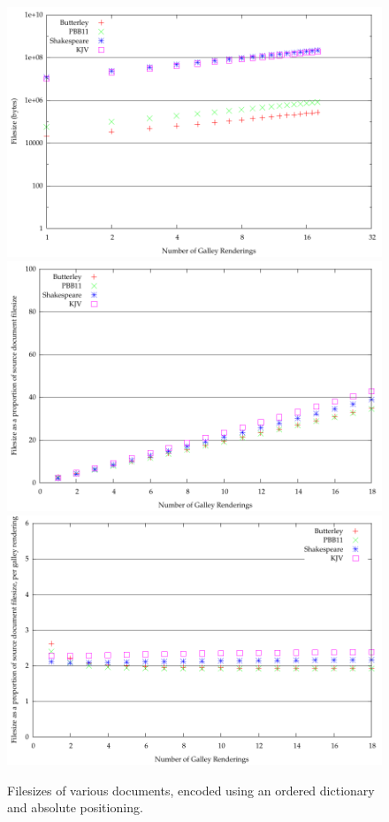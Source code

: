 \begin{figure}
  \begin{center}
  \includegraphics[width=\textwidth]{gnuplot/4-b}
  \includegraphics[width=\textwidth]{gnuplot/4-s}
  \includegraphics[width=\textwidth]{gnuplot/4-r}
  \end{center}
  \caption[Filesizes of documents with an ordered dictionary]{Filesizes of various documents, encoded using an ordered dictionary and absolute positioning.}
  \label{fig:size-ord}
\end{figure}



